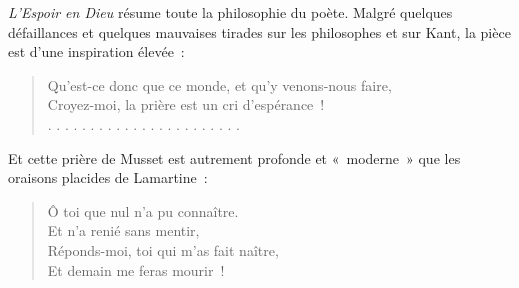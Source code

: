 \documentclass[french,twoside]{book} %
\begin{document}
\noindent \emph{L’Espoir en Dieu} résume toute la philosophie du poète. Malgré quelques défaillances et quelques mauvaises tirades sur les philosophes et sur Kant, la pièce est d’une inspiration élevée :\par


\begin{verse}
Qu’est-ce donc que ce monde, et qu’y venons-nous faire,\\
Croyez-moi, la prière est un cri d’espérance !\\
. . . . . . . . . . . . . . . . . . . . . . .\\
\end{verse}

\noindent Et cette prière de Musset est autrement profonde et « moderne » que les oraisons placides de Lamartine :\par


\begin{verse}
Ô toi que nul n’a pu connaître.\\
Et n’a renié sans mentir,\\
Réponds-moi, toi qui m’as fait naître,\\
Et demain me feras mourir !\\
\end{verse}
\end{document}
